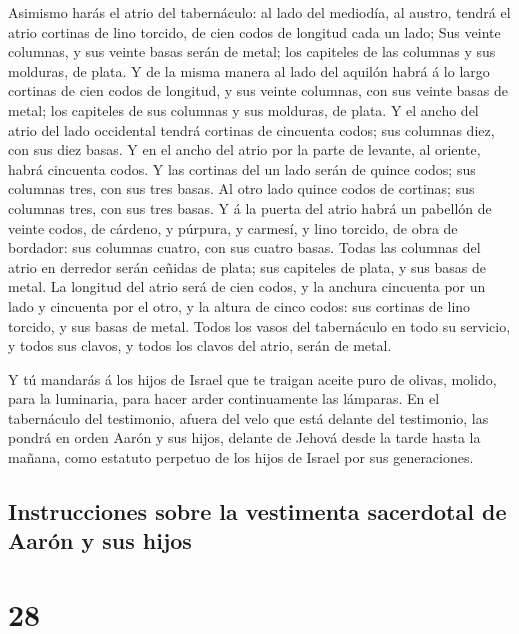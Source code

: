  Asimismo harás el atrio del tabernáculo: al lado del
mediodía, al austro, tendrá el atrio cortinas de lino torcido, de cien
codos de longitud cada un lado;  Sus veinte columnas, y sus
veinte basas serán de metal; los capiteles de las columnas y sus
molduras, de plata.  Y de la misma manera al lado del
aquilón habrá á lo largo cortinas de cien codos de longitud, y sus
veinte columnas, con sus veinte basas de metal; los capiteles de sus
columnas y sus molduras, de plata.  Y el ancho del atrio
del lado occidental tendrá cortinas de cincuenta codos; sus columnas
diez, con sus diez basas.  Y en el ancho del atrio por la
parte de levante, al oriente, habrá cincuenta codos.  Y las
cortinas del un lado serán de quince codos; sus columnas tres, con sus
tres basas.  Al otro lado quince codos de cortinas; sus
columnas tres, con sus tres basas.  Y á la puerta del atrio
habrá un pabellón de veinte codos, de cárdeno, y púrpura, y carmesí, y
lino torcido, de obra de bordador: sus columnas cuatro, con sus cuatro
basas.  Todas las columnas del atrio en derredor serán
ceñidas de plata; sus capiteles de plata, y sus basas de metal.
 La longitud del atrio será de cien codos, y la anchura
cincuenta por un lado y cincuenta por el otro, y la altura de cinco
codos: sus cortinas de lino torcido, y sus basas de metal. 
Todos los vasos del tabernáculo en todo su servicio, y todos sus clavos,
y todos los clavos del atrio, serán de metal.

 Y tú mandarás á los hijos de Israel que te traigan aceite
puro de olivas, molido, para la luminaria, para hacer arder
continuamente las lámparas.  En el tabernáculo del
testimonio, afuera del velo que está delante del testimonio, las pondrá
en orden Aarón y sus hijos, delante de Jehová desde la tarde hasta la
mañana, como estatuto perpetuo de los hijos de Israel por sus
generaciones.

\hypertarget{instrucciones-sobre-la-vestimenta-sacerdotal-de-aaruxf3n-y-sus-hijos}{%
\subsection{Instrucciones sobre la vestimenta sacerdotal de Aarón y sus
hijos}\label{instrucciones-sobre-la-vestimenta-sacerdotal-de-aaruxf3n-y-sus-hijos}}

\hypertarget{section-27}{%
\section{28}\label{section-27}}

